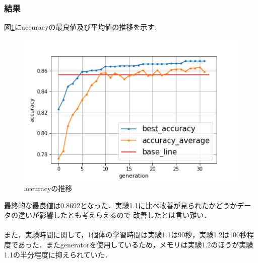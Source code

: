 \documentclass[twocolumn]{jarticle}     %
\begin{document}
\subsubsection{結果}
図\ref{fig:graph2}にaccuracyの最良値及び平均値の推移を示す.
\begin{figure}[hp]
	\centering
	\includegraphics[scale=0.6]{graph2.png}
	\caption{accuracyの推移\label{fig:graph2}}
\end{figure}
最終的な最良値は0.8692となった．実験1.1に比べ改善が見られたかどうかデータの違いが影響したとも考えらえるので
改善したとは言い難い．\\　\\
また，実験時間に関して，1個体の学習時間は実験1.1は90秒，実験1.2は100秒程度であった．またgeneratorを使用しているため，メモリは実験1.2のほうが実験1.1の半分程度に抑えられていた．

\begin{table}[h]
	\centering
	\caption{対照実験\label{tb:taisho}}
\end{table}
\end{document}
